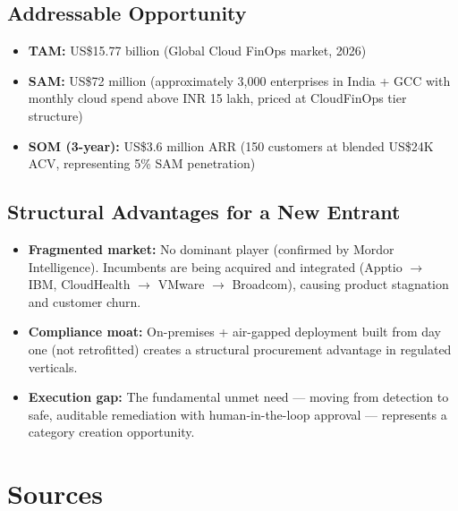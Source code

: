 \documentclass[a4paper,11pt]{article}
\begin{document}
\subsection{Addressable Opportunity}

\begin{itemize}[itemsep=2mm]
    \item \textbf{TAM:} US\$15.77 billion (Global Cloud FinOps market, 2026)
    \item \textbf{SAM:} US\$72 million (approximately 3,000 enterprises in India + GCC with monthly cloud spend above INR 15 lakh, priced at CloudFinOps tier structure)
    \item \textbf{SOM (3-year):} US\$3.6 million ARR (150 customers at blended US\$24K ACV, representing 5\% SAM penetration)
\end{itemize}

\subsection{Structural Advantages for a New Entrant}

\begin{itemize}[itemsep=2mm]
    \item \textbf{Fragmented market:} No dominant player (confirmed by Mordor Intelligence). Incumbents are being acquired and integrated (Apptio $\rightarrow$ IBM, CloudHealth $\rightarrow$ VMware $\rightarrow$ Broadcom), causing product stagnation and customer churn.
    \item \textbf{Compliance moat:} On-premises + air-gapped deployment built from day one (not retrofitted) creates a structural procurement advantage in regulated verticals.
    \item \textbf{Execution gap:} The fundamental unmet need --- moving from detection to safe, auditable remediation with human-in-the-loop approval --- represents a category creation opportunity.
\end{itemize}

\section{Sources}
\end{document}
